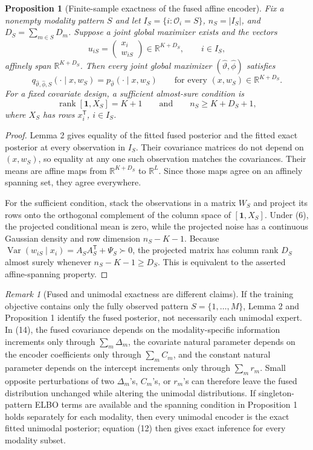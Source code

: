 \documentclass[11pt]{article}
\newcommand{\R}{\mathbb{R}}
\newcommand{\trans}{\mathsf{T}}
\newtheorem{proposition}{Proposition}
\theoremstyle{remark}
\newtheorem{remark}{Remark}
\begin{document}
\begin{proposition}[Finite-sample exactness of the fused affine encoder]
Fix a nonempty modality pattern $S$ and let
$I_S=\{i:\mathcal{O}_i=S\}$, $n_S=|I_S|$, and
$D_S=\sum_{m\in S}D_m$. Suppose a joint global maximizer exists and the vectors
\[
u_{iS}=
\begin{pmatrix}
x_i\\ w_{iS}\end{pmatrix}
\in\R^{K+D_S},
\qquad i\in I_S,
\]
affinely span $\R^{K+D_S}$. Then every joint global maximizer
$(\widehat\vartheta,\widehat\phi)$ satisfies
\[
q_{\widehat\vartheta,\widehat\phi,S}(\cdot\mid x,w_S)
=
p_{\widehat\vartheta}(\cdot\mid x,w_S)
\qquad
\text{for every }(x,w_S)\in\R^{K+D_S}.
\]
For a fixed covariate design, a sufficient almost-sure condition is
\[
\operatorname{rank}[\bm{1},X_S]=K+1
\qquad\text{and}\qquad
n_S\geq K+D_S+1,
\]
where $X_S$ has rows $x_i^\trans$, $i\in I_S$.
\end{proposition}

\begin{proof}
Lemma 2 gives equality of the fitted fused posterior and the fitted exact posterior at every observation in $I_S$. Their covariance matrices do not depend on $(x,w_S)$, so equality at any one such observation matches the covariances. Their means are affine maps from $\R^{K+D_S}$ to $\R^L$. Since those maps agree on an affinely spanning set, they agree everywhere.

For the sufficient condition, stack the observations in a matrix $W_S$ and project its rows onto the orthogonal complement of the column space of $[\bm{1},X_S]$. Under (6), the projected conditional mean is zero, while the projected noise has a continuous Gaussian density and row dimension $n_S-K-1$. Because
$\operatorname{Var}(w_{iS}\mid x_i)=A_SA_S^\trans+\Psi_S\succ0$, the projected matrix has column rank $D_S$ almost surely whenever $n_S-K-1\geq D_S$. This is equivalent to the asserted affine-spanning property.
\end{proof}

\begin{remark}[Fused and unimodal exactness are different claims]
If the training objective contains only the fully observed pattern $S=\{1,\ldots,M\}$, Lemma 2 and Proposition 1 identify the fused posterior, not necessarily each unimodal expert. In (14), the fused covariance depends on the modality-specific information increments only through $\sum_m\Delta_m$, the covariate natural parameter depends on the encoder coefficients only through $\sum_m C_m$, and the constant natural parameter depends on the intercept increments only through $\sum_m r_m$. Small opposite perturbations of two $\Delta_m$'s, $C_m$'s, or $r_m$'s can therefore leave the fused distribution unchanged while altering the unimodal distributions. If singleton-pattern ELBO terms are available and the spanning condition in Proposition 1 holds separately for each modality, then every unimodal encoder is the exact fitted unimodal posterior; equation (12) then gives exact inference for every modality subset.
\end{remark}
\end{document}
